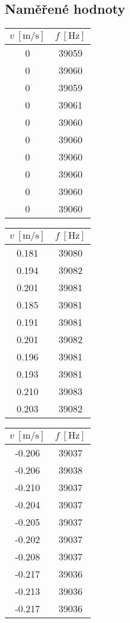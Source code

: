 \documentclass[a4paper,10pt]{article}
\begin{document}
\subsection{Naměřené hodnoty}
\begin{table}[H]
    \centering
    \begin{minipage}{0.32\textwidth}
     \centering
     \begin{tabular}{|c|c|}
        $v\ [\si{\meter\per\second}]$ & $f\ [\si{\hertz}]$ \\ \hline
        0 & 39059 \\
        0 & 39060 \\
        0 & 39059 \\
        0 & 39061 \\
        0 & 39060 \\
        0 & 39060 \\
        0 & 39060 \\
        0 & 39060 \\
        0 & 39060 \\
        0 & 39060 \\
     \end{tabular}
    \end{minipage}
    \begin{minipage}{0.32\textwidth}
     \centering
     \begin{tabular}{|c|c|}
        $v\ [\si{\meter\per\second}]$ & $f\ [\si{\hertz}]$ \\ \hline
        0.181 & 39080 \\
        0.194 & 39082 \\
        0.201 & 39081 \\
        0.185 & 39081 \\
        0.191 & 39081 \\
        0.201 & 39082 \\
        0.196 & 39081 \\
        0.193 & 39081 \\
        0.210 & 39083 \\
        0.203 & 39082 \\
     \end{tabular}
    \end{minipage}
    \begin{minipage}{0.32\textwidth}
     \centering
     \begin{tabular}{|c|c|}
        $v\ [\si{\meter\per\second}]$ & $f\ [\si{\hertz}]$ \\ \hline
        -0.206 & 39037 \\
        -0.206 & 39038 \\
        -0.210 & 39037 \\
        -0.204 & 39037 \\
        -0.205 & 39037 \\
        -0.202 & 39037 \\
        -0.208 & 39037 \\
        -0.217 & 39036 \\
        -0.213 & 39036 \\
        -0.217 & 39036 \\
     \end{tabular}
    \end{minipage}
\end{table}
\end{document}
